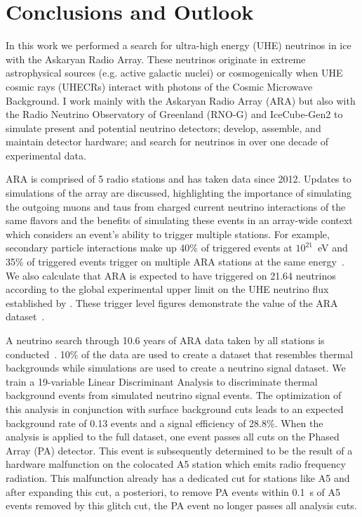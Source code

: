 \chapter{Conclusions and Outlook \label{chap:conclusion}}

In this work we performed a search for ultra-high energy (UHE) neutrinos in ice with the Askaryan Radio Array.
These neutrinos originate in extreme astrophysical sources (e.g. active galactic nuclei) or cosmogenically when UHE cosmic rays (UHECRs) interact with photons of the Cosmic Microwave Background. 
I work mainly with the Askaryan Radio Array (ARA) but also with the Radio Neutrino Observatory of Greenland (\mbox{RNO-G}) and IceCube-Gen2 to simulate present and potential neutrino detectors; develop, assemble, and maintain detector hardware; and search for neutrinos in over one decade of experimental data.

ARA is comprised of 5 radio stations and has taken data since 2012. 
Updates to simulations of the array are discussed, highlighting the importance of simulating the outgoing muons and taus from charged current neutrino interactions of the same flavors and the benefits of simulating these events in an array-wide context which considers an event's ability to trigger multiple stations. 
For example, secondary particle interactions make up 40\% of triggered events at $10^{21}$~eV and 35\% of triggered events trigger on multiple ARA stations at the same energy~\citep{ara_veff}.
We also calculate that ARA is expected to have triggered on 21.64 neutrinos according to the global experimental upper limit on the UHE neutrino flux established by \citep{icecube_search-ehe, anita_iv}. 
These trigger level figures demonstrate the value of the ARA dataset~\citep{ara_secondaries, ara_veff}. 

A neutrino search through 10.6 years of ARA data taken by all stations is conducted~\citep{ara_5sa-icrc}. 
10\% of the data are used to create a dataset that resembles thermal backgrounds while simulations are used to create a neutrino signal dataset.
We train a 19-variable Linear Discriminant Analysis to discriminate thermal background events from simulated neutrino signal events. 
The optimization of this analysis in conjunction with surface background cuts leads to an expected background rate of 0.13 events and a signal efficiency of 28.8\%.
When the analysis is applied to the full dataset, one event passes all cuts on the Phased Array (PA) detector.
This event is subsequently determined to be the result of a hardware malfunction on the colocated A5 station which emits radio frequency radiation. 
This malfunction already has a dedicated cut for stations like A5 and after expanding this cut, a posteriori, to remove PA events within 0.1~s of A5 events removed by this glitch cut, the PA event no longer passes all analysis cuts.

